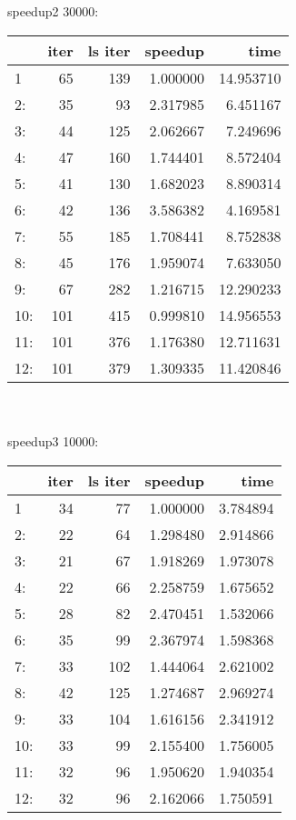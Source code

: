 \documentclass[11pt,a4paper]{article}
\begin{document}
\\ 
\\ 
speedup2 30000:
\\ 
\begin{tabular}{lrrrr}
\toprule
{} &  iter &  ls iter &   speedup &       time \\
\midrule
1   &    65 &      139 &  1.000000 &  14.953710 \\
2:  &    35 &       93 &  2.317985 &   6.451167 \\
3:  &    44 &      125 &  2.062667 &   7.249696 \\
4:  &    47 &      160 &  1.744401 &   8.572404 \\
5:  &    41 &      130 &  1.682023 &   8.890314 \\
6:  &    42 &      136 &  3.586382 &   4.169581 \\
7:  &    55 &      185 &  1.708441 &   8.752838 \\
8:  &    45 &      176 &  1.959074 &   7.633050 \\
9:  &    67 &      282 &  1.216715 &  12.290233 \\
10: &   101 &      415 &  0.999810 &  14.956553 \\
11: &   101 &      376 &  1.176380 &  12.711631 \\
12: &   101 &      379 &  1.309335 &  11.420846 \\
\bottomrule
\end{tabular}
\\ 
\\ 
speedup3 10000:
\\ 
\begin{tabular}{lrrrr}
\toprule
{} &  iter &  ls iter &   speedup &      time \\
\midrule
1   &    34 &       77 &  1.000000 &  3.784894 \\
2:  &    22 &       64 &  1.298480 &  2.914866 \\
3:  &    21 &       67 &  1.918269 &  1.973078 \\
4:  &    22 &       66 &  2.258759 &  1.675652 \\
5:  &    28 &       82 &  2.470451 &  1.532066 \\
6:  &    35 &       99 &  2.367974 &  1.598368 \\
7:  &    33 &      102 &  1.444064 &  2.621002 \\
8:  &    42 &      125 &  1.274687 &  2.969274 \\
9:  &    33 &      104 &  1.616156 &  2.341912 \\
10: &    33 &       99 &  2.155400 &  1.756005 \\
11: &    32 &       96 &  1.950620 &  1.940354 \\
12: &    32 &       96 &  2.162066 &  1.750591 \\
\bottomrule
\end{tabular}
\end{document}
